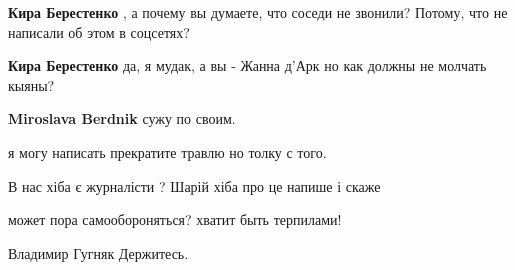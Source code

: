 \begin{itemize}
\begin{itemize}
 
\textbf{Кира Берестенко} , а почему вы думаете, что соседи не звонили? Потому, что не написали об этом в соцсетях?

 
\textbf{Кира Берестенко} да, я мудак, а вы - Жанна д'Арк
но как должны не молчать кыяны?

 
\textbf{Miroslava Berdnik} сужу по своим.
\end{itemize}

 

я могу написать прекратите травлю но толку с того.

 
В нас хіба є журналісти ? Шарій хіба про це напише і скаже

 
может пора самообороняться? хватит быть терпилами!

Владимир Гугняк
Держитесь.

 

\end{itemize}
